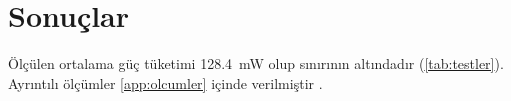 \section{Sonuçlar}
\label{sec:sonuclar}

Ölçülen ortalama güç tüketimi \qty{128.4}{\milli\watt} olup 
sınırının altındadır (\cref{tab:testler}). Ayrıntılı ölçümler
\cref{app:olcumler} içinde verilmiştir \parencite{lamport1994latex}.
